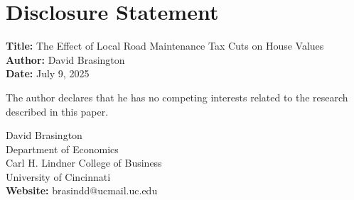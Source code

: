 \documentclass[12pt]{article}
\begin{document}
\section*{\centering Disclosure Statement}

\begin{center}
\textbf{Title:} The Effect of Local Road Maintenance Tax Cuts on House Values \\
\textbf{Author:} David Brasington \\
\textbf{Date:} July 9, 2025
\end{center}

\begin{flushleft}

The author declares that he has no competing interests related to the research described in this paper.

\vspace{1cm}


David Brasington \\
Department of Economics \\
Carl H. Lindner College of Business \\
University of Cincinnati \\
\textbf{Website:} brasindd@ucmail.uc.edu
\end{flushleft}
\end{document}
